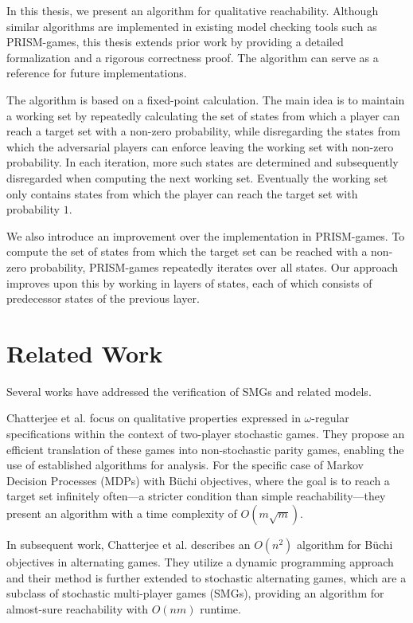 In this thesis, we present an algorithm for qualitative reachability. Although similar algorithms are implemented in existing model checking tools such as PRISM-games, this thesis extends prior work by providing a detailed formalization and a rigorous correctness proof. The algorithm can serve as a reference for future implementations.

The algorithm is based on a fixed-point calculation. The main idea is to maintain a working set by repeatedly calculating the set of states from which a player can reach a target set with a non-zero probability, while disregarding the states from which the adversarial players can enforce leaving the working set with non-zero probability. In each iteration, more such states are determined and subsequently disregarded when computing the next working set. Eventually the working set only contains states from which the player can reach the target set with probability $1$.

We also introduce an improvement over the implementation in PRISM-games. To compute the set of states from which the target set can be reached with a non-zero probability, PRISM-games repeatedly iterates over all states. Our approach improves upon this by working in layers of states, each of which consists of predecessor states of the previous layer.

\section{Related Work}
Several works have addressed the verification of SMGs and related models.

Chatterjee et al. \cite{chatterjee_simple_2003} focus on qualitative properties expressed in $\omega$-regular specifications within the context of two-player stochastic games. They propose an efficient translation of these games into non-stochastic parity games, enabling the use of established algorithms for analysis. For the specific case of Markov Decision Processes (MDPs) with Büchi objectives, where the goal is to reach a target set infinitely often---a stricter condition than simple reachability---they present an algorithm with a time complexity of $O(m \sqrt{m})$.

In subsequent work, Chatterjee et al. \cite{chatterjee_on2_2011} describes an $O(n^2)$ algorithm for Büchi objectives in alternating games. They utilize a dynamic programming approach and their method is further extended to stochastic alternating games, which are a subclass of stochastic multi-player games (SMGs), providing an algorithm for almost-sure reachability with $O(nm)$ runtime.

